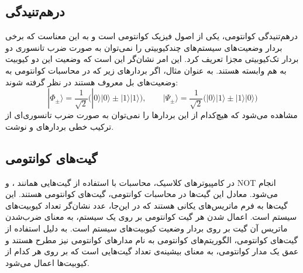 \subsection{درهم‌تنیدگی}

درهم‌تنیدگی کوانتومی،
یکی از اصول فیزیک کوانتومی است و به این معناست که برخی بردار وضعیت‌های سیستم‌های چندکیوبیتی را نمی‌توان به صورت ضرب تانسوری دو بردار تک‌کیوبیتی مجزا تعریف کرد. این امر نشان‌گر این است که وضعیت این دو کیوبیت به هم وابسته هستند.
به عنوان مثال، اگر بردارهای زیر که در محاسبات کوانتومی به وضعیت‌های بل معروف هستند در نظر گرفته شوند:
\begin{equation}
|{\Phi_\pm}\rangle = \frac{1}{\sqrt 2}\big(|0\rangle| 0\rangle\pm |1\rangle| 1\rangle\big), \qquad |{\Psi_{\pm}}\rangle=\frac{1}{\sqrt 2}\big(|0\rangle| 1\rangle\pm  |1\rangle|0\rangle\big)
\end{equation}
\hsm
مشاهده می‌شود که هیچ‌کدام از این بردارها را نمی‌توان به صورت ضرب تانسوری‌ای از ترکیب خطی بردارهای
\lr{$|0\rangle$} و \lr{$|1\rangle$}
نوشت.

\subsection{گیت‌های کوانتومی}
در کامپیوترهای کلاسیک، محاسبات با استفاده از گیت‌هایی همانند 
،  و NOT
انجام می‌شود.
معادل این گیت‌ها در محاسبات کوانتومی، گیت‌های کوانتومی هستند. این گیت‌ها به فرم ماتریس‌های یکانی  هستند که در این‌جا، عدد 
نشان‌گر تعداد کیوبیت‌های سیستم است.
اعمال شدن هر گیت کوانتومی بر روی یک سیستم، به معنای ضرب‌شدن ماتریس آن گیت بر روی بردار وضعیت کیوبیت‌های سیستم است.
به دلیل استفاده از گیت‌های کوانتومی، الگوریتم‌های کوانتومی به نام مدارهای کوانتومی نیز مطرح هستند و عمق یک مدار کوانتومی، به معنای بیشینه‌ی تعداد گیت‌هایی است که بر روی هر کدام از کیوبیت‌ها اعمال می‌شود.
